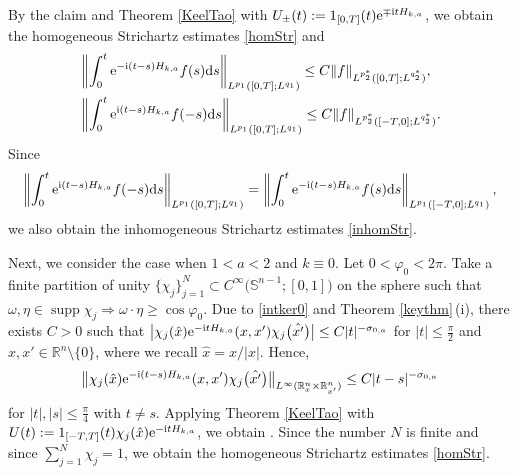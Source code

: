 \documentclass[pdftex]{sigma}
\numberwithin{equation}{section}
\def\R{\mathbb{R}}%
\DeclareMathOperator{\supp}{supp}%
\def\f{\varphi}
\def\s{\sigma}
\def\y{\eta}
\begin{document}
By the claim and Theorem \ref{KeelTao} with $U_{\pm}(t):=1_{[0,T]}(t){\rm e}^{\mp {\rm i}tH_{k,a}}$, we obtain the homogeneous Strichartz estimates \eqref{homStr} and
\begin{align*}
&\left\|\int_{0}^t{\rm e}^{-{\rm i}(t-s)H_{k,a}}f(s){\rm d}s \right\|_{L^{p_1}([0,T]; L^{q_1})} \leq C\|f\|_{L^{p_2^*}([0,T]; L^{q_2^*})},\\
&\left\|\int_{0}^t{\rm e}^{{\rm i}(t-s)H_{k,a}}f(-s){\rm d}s \right\|_{L^{p_1}([0,T]; L^{q_1})} \leq C\|f\|_{L^{p_2^*}([-T,0]; L^{q_2^*})}.
\end{align*}
Since
\[
\left\|\int_{0}^t{\rm e}^{{\rm i}(t-s)H_{k,a}}f(-s){\rm d}s \right\|_{L^{p_1}([0,T]; L^{q_1})}=\left\|\int_{0}^t{\rm e}^{-{\rm i}(t-s)H_{k,a}}f(s){\rm d}s \right\|_{L^{p_1}([-T,0]; L^{q_1})},
\] we also obtain the inhomogeneous Strichartz estimates \eqref{inhomStr}.






Next, we consider the case when $1<a<2$ and $k\equiv 0$. Let $0<\f_0<2\pi$.
Take a finite partition of unity $\{\chi_j\}_{j=1}^N\subset C^{\infty}\bigl(\mathbb{S}^{n-1};[0,1]\bigr)$ on the sphere such that
$
\omega,\y\in \supp \chi_j\Rightarrow \omega\cdot \y\geq \cos\f_0$.
Due to \eqref{intker0} and Theorem \ref{keythm}\,(i), there exists $C>0$ such that $\big|\chi_j(\hat{x}){\rm e}^{- {\rm i}tH_{k,a}}(x,x')\chi_j\bigl(\hat{x'}\bigr)\big|\leq C|t|^{-\s_{0,a}}$ for $|t|\leq \frac{\pi}{2}$ and $x,x'\in \R^n\setminus \{0\}$, where we recall $\hat{x}=x/|x|$. Hence,
\begin{align*}
\big\|\chi_j(\hat{x}){\rm e}^{- {\rm i}(t-s)H_{k,a}}(x,x')\chi_j\bigl(\hat{x'}\bigr)\big\|_{L^{\infty}(\R^n_x\times \R^n_{x'})}\leq C|t-s|^{-\s_{0,a}}
\end{align*}
for $|t|, |s|\leq \frac{\pi}{4}$ with $t\neq s$.
Applying Theorem \ref{KeelTao} with $U(t):=1_{[-T,T]}(t)\chi_j(\hat{x}){\rm e}^{- {\rm i}tH_{k,a}}$, we obtain
.
Since the number $N$ is finite and since $\sum_{j=1}^N\chi_j=1$, we obtain the homogeneous Strichartz estimates \eqref{homStr}.
\end{document}
